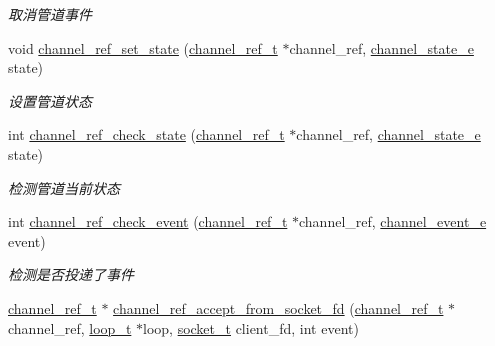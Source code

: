 \begin{DoxyCompactItemize}
\begin{DoxyCompactList}\small\item\em 取消管道事件 \end{DoxyCompactList}\item 
void \hyperlink{a00047_a7e19561cc06440ebdf63ced5526c9e21_a7e19561cc06440ebdf63ced5526c9e21}{channel\+\_\+ref\+\_\+set\+\_\+state} (\hyperlink{a00050_a151271c9d188ef28d4d24bb81dcc1263_a151271c9d188ef28d4d24bb81dcc1263}{channel\+\_\+ref\+\_\+t} $\ast$channel\+\_\+ref, \hyperlink{a00050_a1956eea3012f780b5d592a9d09d9873c_a1956eea3012f780b5d592a9d09d9873c}{channel\+\_\+state\+\_\+e} state)
\begin{DoxyCompactList}\small\item\em 设置管道状态 \end{DoxyCompactList}\item 
int \hyperlink{a00101_gadddbdc58824b567334d46493decc90f8_gadddbdc58824b567334d46493decc90f8}{channel\+\_\+ref\+\_\+check\+\_\+state} (\hyperlink{a00050_a151271c9d188ef28d4d24bb81dcc1263_a151271c9d188ef28d4d24bb81dcc1263}{channel\+\_\+ref\+\_\+t} $\ast$channel\+\_\+ref, \hyperlink{a00050_a1956eea3012f780b5d592a9d09d9873c_a1956eea3012f780b5d592a9d09d9873c}{channel\+\_\+state\+\_\+e} state)
\begin{DoxyCompactList}\small\item\em 检测管道当前状态 \end{DoxyCompactList}\item 
int \hyperlink{a00047_a7134a0dab5db76d26dac56924267e5ac_a7134a0dab5db76d26dac56924267e5ac}{channel\+\_\+ref\+\_\+check\+\_\+event} (\hyperlink{a00050_a151271c9d188ef28d4d24bb81dcc1263_a151271c9d188ef28d4d24bb81dcc1263}{channel\+\_\+ref\+\_\+t} $\ast$channel\+\_\+ref, \hyperlink{a00050_a5ad43ab162fdf9ad53cde10ed3d87d99_a5ad43ab162fdf9ad53cde10ed3d87d99}{channel\+\_\+event\+\_\+e} event)
\begin{DoxyCompactList}\small\item\em 检测是否投递了事件 \end{DoxyCompactList}\item 
\hyperlink{a00050_a151271c9d188ef28d4d24bb81dcc1263_a151271c9d188ef28d4d24bb81dcc1263}{channel\+\_\+ref\+\_\+t} $\ast$ \hyperlink{a00047_a8312d0f4fcecc79d87a261e8b462ce95_a8312d0f4fcecc79d87a261e8b462ce95}{channel\+\_\+ref\+\_\+accept\+\_\+from\+\_\+socket\+\_\+fd} (\hyperlink{a00050_a151271c9d188ef28d4d24bb81dcc1263_a151271c9d188ef28d4d24bb81dcc1263}{channel\+\_\+ref\+\_\+t} $\ast$channel\+\_\+ref, \hyperlink{a00050_a9c3ad1cd2de83e09f3a7b59fa82c94ee_a9c3ad1cd2de83e09f3a7b59fa82c94ee}{loop\+\_\+t} $\ast$loop, \hyperlink{a00050_a0d9e0afbf02fb6ed6c5b1415dce51b05_a0d9e0afbf02fb6ed6c5b1415dce51b05}{socket\+\_\+t} client\+\_\+fd, int event)

\end{DoxyCompactItemize}
